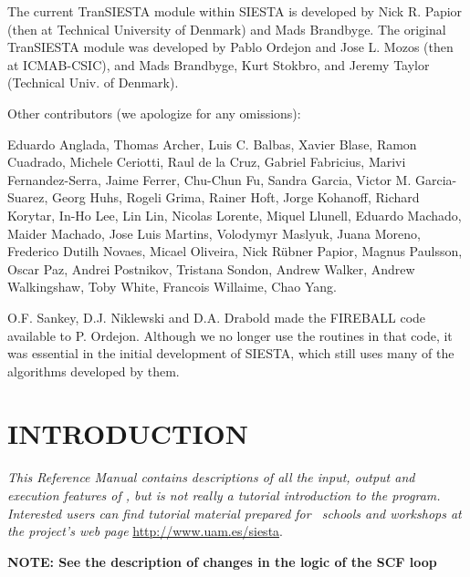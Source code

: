 The current TranSIESTA module within SIESTA is developed by 
Nick R. Papior (then at Technical University of Denmark) and Mads Brandbyge. 
The original TranSIESTA module was developed by
Pablo Ordejon and Jose L. Mozos (then at ICMAB-CSIC), and Mads Brandbyge,
Kurt Stokbro, and Jeremy Taylor (Technical Univ. of Denmark).

Other contributors (we apologize for any omissions):

Eduardo Anglada,
Thomas Archer,
Luis C. Balbas,
Xavier Blase,
Ramon Cuadrado,
Michele Ceriotti,
Raul de la Cruz,
Gabriel Fabricius,
Marivi Fernandez-Serra,
Jaime Ferrer,
Chu-Chun Fu,
Sandra Garcia,
Victor M. Garcia-Suarez,
Georg Huhs,
Rogeli Grima,
Rainer Hoft,
Jorge Kohanoff,
Richard Korytar,
In-Ho Lee,
Lin Lin,
Nicolas Lorente,
Miquel Llunell,
Eduardo Machado,
Maider Machado,
Jose Luis Martins,
Volodymyr Maslyuk,
Juana Moreno,
Frederico Dutilh Novaes, 
Micael Oliveira,
Nick R\"ubner Papior,
Magnus Paulsson,
Oscar Paz,
Andrei Postnikov,
Tristana Sondon,
Andrew Walker,
Andrew Walkingshaw,
Toby White,
Francois Willaime,
Chao Yang.

O.F. Sankey, D.J. Niklewski and D.A. Drabold made the FIREBALL code
available to P. Ordejon.  Although we no longer use the routines in
that code, it was essential in the initial development of SIESTA,
which still uses many of the algorithms developed by them.

\tableofcontents

\newpage

\section{INTRODUCTION}

\textit{This Reference Manual contains descriptions of all the input,
  output and execution features of \siesta, but is not really a
  tutorial introduction to the program. Interested users can find
  tutorial material prepared for \siesta\ schools and workshops at
  the project's web page} \url{http://www.uam.es/siesta}.


\textbf{NOTE: See the description of changes in the logic of the SCF loop}

